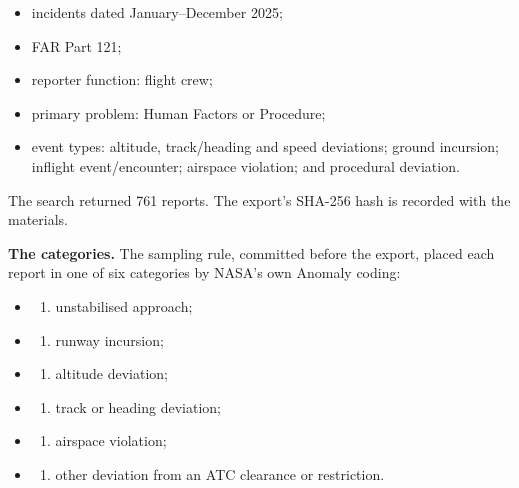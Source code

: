 \documentclass[review,12pt]{elsarticle}
\providecommand{\tightlist}{\setlength{\itemsep}{0pt}\setlength{\parskip}{0pt}}
\begin{document}
\begin{itemize}
\tightlist
\item
  incidents dated January--December 2025;
\item
  FAR Part 121;
\item
  reporter function: flight crew;
\item
  primary problem: Human Factors or Procedure;
\item
  event types: altitude, track/heading and speed deviations; ground incursion; inflight event/encounter; airspace violation; and procedural deviation.
\end{itemize}

The search returned 761 reports. The export's SHA-256 hash is recorded with the materials.

\textbf{The categories.} The sampling rule, committed before the export, placed each report in one of six categories by NASA's own Anomaly coding:

\begin{itemize}
\item
  \begin{enumerate}
  \def\labelenumi{(\Alph{enumi})}
  \tightlist
  \item
    unstabilised approach;
  \end{enumerate}
\item
  \begin{enumerate}
  \def\labelenumi{(\Alph{enumi})}
  \setcounter{enumi}{1}
  \tightlist
  \item
    runway incursion;
  \end{enumerate}
\item
  \begin{enumerate}
  \def\labelenumi{(\Alph{enumi})}
  \setcounter{enumi}{2}
  \tightlist
  \item
    altitude deviation;
  \end{enumerate}
\item
  \begin{enumerate}
  \def\labelenumi{(\Alph{enumi})}
  \setcounter{enumi}{3}
  \tightlist
  \item
    track or heading deviation;
  \end{enumerate}
\item
  \begin{enumerate}
  \def\labelenumi{(\Alph{enumi})}
  \setcounter{enumi}{4}
  \tightlist
  \item
    airspace violation;
  \end{enumerate}
\item
  \begin{enumerate}
  \def\labelenumi{(\Alph{enumi})}
  \setcounter{enumi}{5}
  \tightlist
  \item
    other deviation from an ATC clearance or restriction.
  \end{enumerate}
\end{itemize}
\end{document}

